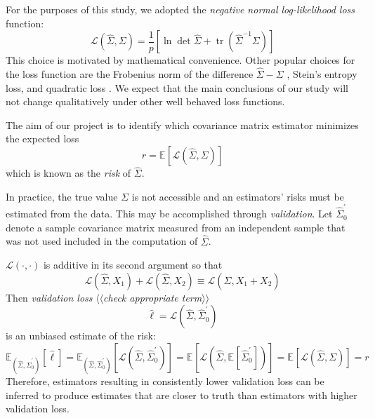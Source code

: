\documentclass[10pt]{article}
\newcommand{\Kcomment}[1]{{\color{blue}{[KJ: #1]}}}
\DeclareMathOperator{\Tr}{tr}
\newcommand{\loss}[1]{\mathcal L\left(#1\right)}
\newcommand{\E}[2][]{\mathbb E_{#1}\left[ #2\right]}    %
\newcommand{\TODO}[1]{\emph{\small\color{blue}$\langle\langle$#1$\rangle\rangle$}}
\begin{document}
For the purposes of this study, we adopted the \emph{negative normal log-likelihood loss} function:
\begin{equation}\label{eq:loss}
\loss{\hat\Sigma,\Sigma} = \frac 1 p\left[\ln \det \hat \Sigma + \Tr(\hat \Sigma^{-1}\Sigma)\right]
\end{equation}
This choice is motivated by mathematical convenience. Other popular choices for the loss function are the Frobenius norm of the difference $\hat\Sigma-\Sigma$ \cite{Ledoit:2004,Schafer:2005}, Stein's entropy loss, and quadratic loss \cite{James:1961,Fan:2008}.  We expect that the main conclusions of our study will not change qualitatively under other well behaved loss functions.

The aim of our project is to identify which covariance matrix estimator minimizes the expected loss 
\begin{equation}
r = \E{\loss{\hat\Sigma, \Sigma}}
\end{equation}
which is known as the \emph{risk} of $\hat\Sigma$.

In practice, the true value $\Sigma$ is not accessible and an estimators' risks must be estimated from the data.  This may be accomplished through \emph{validation}.  \Kcomment{If you will discuss validation later, point to it.}
Let $\hat\Sigma_0^\prime$ denote a sample covariance matrix measured from an independent sample that was not used included in the computation of $\hat\Sigma$. 

$\loss{\cdot,\cdot}$ is additive in its second argument so that \Kcomment{You frequently use ``such that'' instead of ``so that''}
 \begin{equation}\label{eq:additivity}
 \loss{\hat\Sigma,X_1} + \loss{\hat\Sigma,X_2} \equiv \loss{\hat\Sigma,X_1+X_2}
 \end{equation}
Then \emph{validation loss}  \TODO{check appropriate term}
\begin{equation}\label{eq:validationLoss}
\hat \ell = \loss{\hat\Sigma,\hat\Sigma_0^\prime}
\end{equation}
is an unbiased estimate of the risk:
 \begin{equation}\label{eq:empiricalRisk}
\E[(\hat\Sigma, \hat\Sigma_0^\prime)] {\hat\ell} 
= \E[(\hat\Sigma, \hat\Sigma_0^\prime)]{\loss{\hat\Sigma,\hat\Sigma_0^\prime}}
= \E{\loss{\hat\Sigma,\E{\hat\Sigma_0^\prime}}}
= \E{\loss{\hat\Sigma,\Sigma}} = r
 \end{equation}
Therefore, estimators resulting in consistently lower validation loss can be inferred to produce estimates that are closer to truth than estimators with higher validation loss.
\Kcomment{This is probably not a very insightful question -- but why do we assume that the sample covariance
is what we compare $\hat\Sigma$ when we validate the results.  Our point is that this estimate is not very good.}
\end{document}

